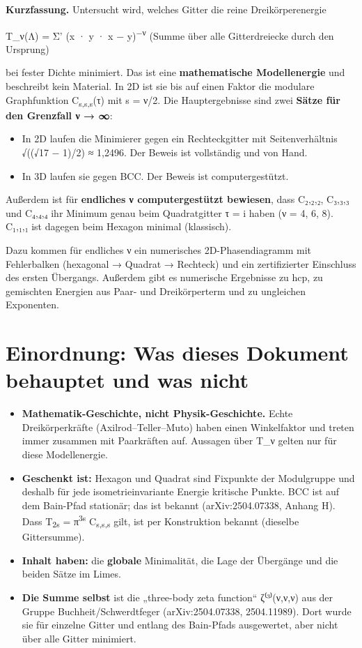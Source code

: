 \textbf{Kurzfassung.} Untersucht wird, welches Gitter die reine Dreikörperenergie

T\_ν(Λ) = Σ' (\textbar x\textbar{} · \textbar y\textbar{} · \textbar x − y\textbar)\textsuperscript{−ν} (Summe über alle Gitterdreiecke durch den Ursprung)

bei fester Dichte minimiert. Das ist eine \textbf{mathematische Modellenergie} und beschreibt kein Material. In 2D ist sie bis auf einen Faktor die modulare Graphfunktion C\textsubscript{s,s,s}(τ) mit s = ν/2. Die Hauptergebnisse sind zwei \textbf{Sätze für den Grenzfall ν → ∞}:

\begin{itemize}
\tightlist
\item
  In 2D laufen die Minimierer gegen ein Rechteckgitter mit Seitenverhältnis √((√17 − 1)/2) ≈ 1,2496. Der Beweis ist vollständig und von Hand.
\item
  In 3D laufen sie gegen BCC. Der Beweis ist computergestützt.
\end{itemize}

Außerdem ist für \textbf{endliches ν computergestützt bewiesen}, dass C₂,₂,₂, C₃,₃,₃ und C₄,₄,₄ ihr Minimum genau beim Quadratgitter τ = i haben (ν = 4, 6, 8). C₁,₁,₁ ist dagegen beim Hexagon minimal (klassisch).

Dazu kommen für endliches ν ein numerisches 2D-Phasendiagramm mit Fehlerbalken (hexagonal → Quadrat → Rechteck) und ein zertifizierter Einschluss des ersten Übergangs. Außerdem gibt es numerische Ergebnisse zu hcp, zu gemischten Energien aus Paar- und Dreikörperterm und zu ungleichen Exponenten.

\section{Einordnung: Was dieses Dokument behauptet und was nicht}

\begin{itemize}
\tightlist
\item
  \textbf{Mathematik-Geschichte, nicht Physik-Geschichte.} Echte Dreikörperkräfte (Axilrod--Teller--Muto) haben einen Winkelfaktor und treten immer zusammen mit Paarkräften auf. Aussagen über T\_ν gelten nur für diese Modellenergie.
\item
  \textbf{Geschenkt ist:} Hexagon und Quadrat sind Fixpunkte der Modulgruppe und deshalb für jede isometrieinvariante Energie kritische Punkte. BCC ist auf dem Bain-Pfad stationär; das ist bekannt (arXiv:2504.07338, Anhang H). Dass T\textsubscript{2s} = π\textsuperscript{3s} C\textsubscript{s,s,s} gilt, ist per Konstruktion bekannt (dieselbe Gittersumme).
\item
  \textbf{Inhalt haben:} die \textbf{globale} Minimalität, die Lage der Übergänge und die beiden Sätze im Limes.
\item
  \textbf{Die Summe selbst} ist die „three-body zeta function`` ζ⁽³⁾(ν,ν,ν) aus der Gruppe Buchheit/Schwerdtfeger (arXiv:2504.07338, 2504.11989). Dort wurde sie für einzelne Gitter und entlang des Bain-Pfads ausgewertet, aber nicht über alle Gitter minimiert.
\end{itemize}

